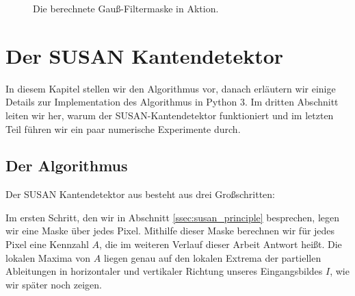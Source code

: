 \documentclass[a4paper, 11pt]{report}
\theoremstyle{definition}
\begin{document}
\begin{center}
\begin{figure}[H]
\begin{minipage}{.475\textwidth}
				\end{minipage}
			\normalsize
			\caption{Die berechnete Gauß-Filtermaske in Aktion.}
			\end{figure}
		\end{center}



\chapter{Der SUSAN Kantendetektor}
	In diesem Kapitel stellen wir den Algorithmus vor, danach erläutern wir einige Details zur Implementation des Algorithmus in Python 3. Im dritten Abschnitt leiten wir her, warum der SUSAN-Kantendetektor funktioniert und im letzten Teil führen wir ein paar numerische Experimente durch.

	\section{Der Algorithmus}\label{sec:thealgorithm}
		Der SUSAN Kantendetektor aus \cite{SUSAN} besteht aus drei Großschritten:

		Im ersten Schritt, den wir in Abschnitt \ref{ssec:susan_principle} besprechen, legen wir eine Maske über jedes Pixel. Mithilfe dieser Maske berechnen wir für jedes Pixel eine Kennzahl $A$, die im weiteren Verlauf dieser Arbeit \glqq Antwort\grqq{} heißt. Die lokalen Maxima von $A$ liegen genau auf den lokalen Extrema der partiellen Ableitungen in horizontaler und vertikaler Richtung unseres Eingangsbildes $I$, wie wir später noch zeigen.
\end{document}
